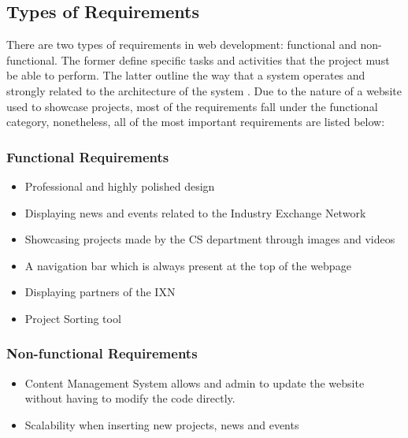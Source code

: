 \documentclass[fontsize=11pt]{extarticle}
\numberwithin{figure}{section} %
\numberwithin{table}{section}%
\providecommand{\tightlist}{%
  \setlength{\itemsep}{0pt}\setlength{\parskip}{0pt}}
\begin{document}
\hypertarget{types-of-requirements}{%
\subsection{Types of Requirements}\label{types-of-requirements}}

There are two types of requirements in web development: functional and
non-functional. The former define specific tasks and activities that the
project must be able to perform. The latter outline the way that a
system operates and strongly related to the architecture of the system
\cite{g5}. Due to the nature of a website used to showcase projects,
most of the requirements fall under the functional category,
nonetheless, all of the most important requirements are listed below:

\hypertarget{functional-requirements}{%
\subsubsection{Functional Requirements}\label{functional-requirements}}

\begin{itemize}
\tightlist
\item
  Professional and highly polished design
\item
  Displaying news and events related to the Industry Exchange Network
\item
  Showcasing projects made by the CS department through images and
  videos
\item
  A navigation bar which is always present at the top of the webpage
\item
  Displaying partners of the IXN
\item
  Project Sorting tool
\end{itemize}

\hypertarget{non-functional-requirements}{%
\subsubsection{Non-functional
Requirements}\label{non-functional-requirements}}

\begin{itemize}
\tightlist
\item
  Content Management System allows and admin to update the website
  without having to modify the code directly.
\item
  Scalability when inserting new projects, news and events
\end{itemize}
\end{document}
